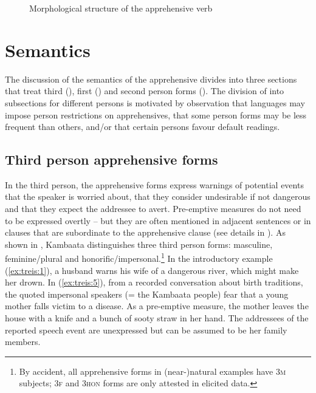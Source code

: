 \documentclass[output=paper,colorlinks,citecolor=brown,
]{langsci/langscibook}
\begin{document}
\begin{figure}
    \caption{Morphological structure of the apprehensive verb}
    \label{fig:treis:4}
\end{figure}

\section{Semantics}\label{sec:treis:3}

The discussion of the semantics of the apprehensive divides into three sections that treat third (), first () and second person forms (). The division of  into subsections for different persons is motivated by  observation that languages may impose person restrictions on apprehensives, that some person forms may be less frequent than others, and/or that certain persons favour default readings.

\subsection{Third person apprehensive forms}\label{sec:treis:3.1}

In the third person, the apprehensive forms express warnings of potential events that the speaker is worried about, that they consider undesirable if not dangerous and that they expect the addressee to avert. Pre-emptive measures do not need to be expressed overtly -- but they are often mentioned in adjacent sentences or in clauses that are subordinate to the apprehensive clause (see details in ). As shown in , Kambaata distinguishes three third person forms: masculine, feminine\slash plural and honorific\slash impersonal.\footnote{By accident, all apprehensive forms in (near-)natural examples have \textsc{3m} subjects; \textsc{3f} and \textsc{3hon} forms are only attested in elicited data.}  In the introductory example (\ref{ex:treis:1}), a husband warns his wife of a dangerous river, which might make her drown. In (\ref{ex:treis:5}), from a recorded conversation about birth traditions, the quoted impersonal speakers (= the Kambaata people) fear that a young mother falls victim to a disease. As a pre-emptive measure, the mother leaves the house with a knife and a bunch of sooty straw in her hand. The addressees of the reported speech event are unexpressed but can be assumed to be her family members.
\end{document}
